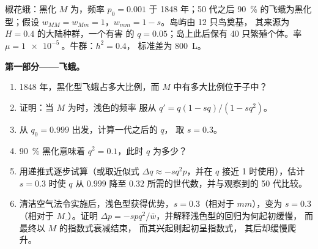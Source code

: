 \begin{problem}
\label{pb:b2:population-genetics:1}
椒花蛾：黑化 $M$ 为，频率 $p_0 = 0.001$
于 1848 年；50 代之后 \qty{90}{\%} 的飞蛾为黑化型；假设
$w_{MM} = w_{Mm} = 1$，$w_{mm} = 1 - s$。岛屿由 12 只鸟奠基，
其来源为 $H = 0.4$ 的大陆种群，一个有害
的 $q = 0.05$；岛上此后保有
40 只繁殖个体。率 $\mu = \qty{1e-5}{}$。牛群：$h^{2} = 0.4$，
标准差为 \qty{800}{L}。

\medskip
\noindent\textbf{第一部分——飞蛾。}
\begin{enumerate}
  \item 1848 年，黑化型飞蛾占多大比例，而
        $M$ 中有多大比例位于子中？
  \item 证明：当 $M$ 为时，浅色的频率
        服从 $q' = q(1 - sq)/(1 - sq^{2})$。
  \item 从 $q_0 = 0.999$ 出发，计算一代之后的 $q$，
        取 $s = 0.3$。
  \item \qty{90}{\%} 黑化意味着 $q^{2} = 0.1$，此时 $q$ 为多少？
  \item 用递推式逐步试算（或取近似式
        $\Delta q \approx -sq^{2}p$，并在 $q$ 接近 1 时使用），估计
        $s = 0.3$ 时使 $q$ 从 $0.999$
        降至 $0.32$ 所需的世代数，并与观察到的 50 代比较。
  \item 清洁空气法令实施后，浅色型获得优势，$s
        = 0.3$（相对于 $mm$），变为 $s = 0.3$（相对于 $M\_$）。证明
        $\Delta p = -spq^{2}/\bar w$，并解释浅色型的回归为何起初缓慢，
        而最终以 $M$ 的指数式衰减结束，
        而其兴起则起初呈指数式，
        其后却缓慢爬升。
\end{enumerate}


\end{problem}
